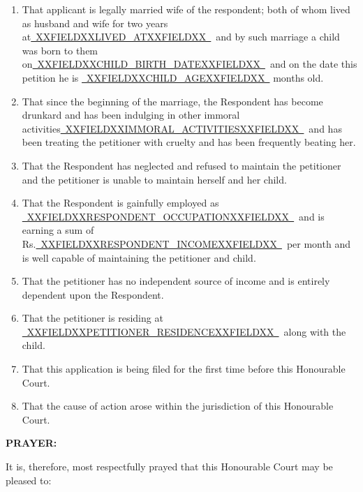 \documentclass[12pt,a4paper]{article}
\newcommand{\fillline}[1]{\underline{~#1~}}
\begin{document}
\begin{enumerate}[leftmargin=*, label=\arabic{enumi}., itemsep=10pt, topsep=4pt]

  \item That applicant is legally married wife of the respondent; both of
        whom lived as husband and wife for two years at\fillline{XXFIELDXXLIVED_ATXXFIELDXX}\ and by
        such marriage a child was born to them on\fillline{XXFIELDXXCHILD_BIRTH_DATEXXFIELDXX}\ and on the date
        this petition he is \fillline{XXFIELDXXCHILD_AGEXXFIELDXX} months old.

  \item That since the beginning of the marriage, the Respondent has
        become drunkard and has been indulging in other immoral
        activities\fillline{XXFIELDXXIMMORAL_ACTIVITIESXXFIELDXX}\ and has been treating the petitioner with
        cruelty and has been frequently beating her.

  \item That the Respondent has neglected and refused to maintain the
        petitioner and the petitioner is unable to maintain herself and her child.

  \item That the Respondent is gainfully employed as \fillline{XXFIELDXXRESPONDENT_OCCUPATIONXXFIELDXX}\ and is
        earning a sum of Rs.\fillline{XXFIELDXXRESPONDENT_INCOMEXXFIELDXX}\ per month and is well capable of
        maintaining the petitioner and child.

  \item That the petitioner has no independent source of income and is
        entirely dependent upon the Respondent.

  \item That the petitioner is residing at \fillline{XXFIELDXXPETITIONER_RESIDENCEXXFIELDXX}\ along with
        the child.

  \item That this application is being filed for the first time before this
        Honourable Court.

  \item That the cause of action arose within the jurisdiction of this
        Honourable Court.

\end{enumerate}

\vspace{14pt}

\textbf{PRAYER:}

It is, therefore, most respectfully prayed that this Honourable Court may be
pleased to:
\end{document}
